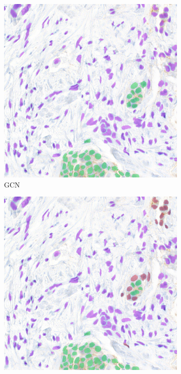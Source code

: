 \begin{figure}[H]
    \centering
    \begin{subfigure}[b]{0.45\textwidth}
    \includegraphics[width=\textwidth]{imgs/qual/breast/gcn-full1.png}
    \caption{GCN}
  \end{subfigure}
  \hfill
  \begin{subfigure}[b]{0.45\textwidth}
    \includegraphics[width=\textwidth]{imgs/qual/breast/gat-full1.png}

\end{subfigure}
\end{figure}
